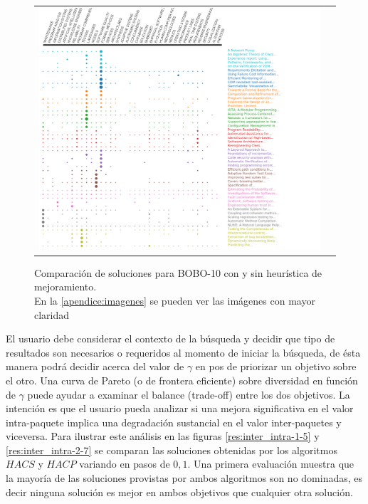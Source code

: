 \begin{figure}[H]
\begin{tabular}{cc}
		\includegraphics[width=0.45\linewidth]{img/gamma-09-alg-4.png}\\
	\end{tabular}
	\caption{Comparación de soluciones para BOBO-10 con y sin heurística de mejoramiento.\\En la \autoref{apendice:imagenes} se pueden ver las imágenes con mayor claridad}
	\label{res:bobo}
\end{figure}

El usuario debe considerar el contexto de la búsqueda y decidir que tipo de resultados son necesarios o requeridos al momento de iniciar la búsqueda, de ésta manera podrá decidir acerca del valor de $\gamma$ en pos de priorizar un objetivo sobre el otro. Una curva de Pareto (o de frontera eficiente) sobre diversidad en función de $\gamma$ puede ayudar a examinar el balance (trade-off) entre los dos objetivos. La intención es que el usuario pueda analizar si una mejora significativa en el valor intra-paquete implica una degradación sustancial en el valor inter-paquetes y viceversa. Para ilustrar este análisis en las figuras \ref{res:inter_intra-1-5} y \ref{res:inter_intra-2-7} se comparan las soluciones obtenidas por los algoritmos $HACS$ y $HACP$ variando en pasos de $0,1$. Una primera evaluación muestra que la mayoría de las soluciones provistas por ambos algoritmos son no dominadas, es decir ninguna solución es mejor en ambos objetivos que cualquier otra solución.

